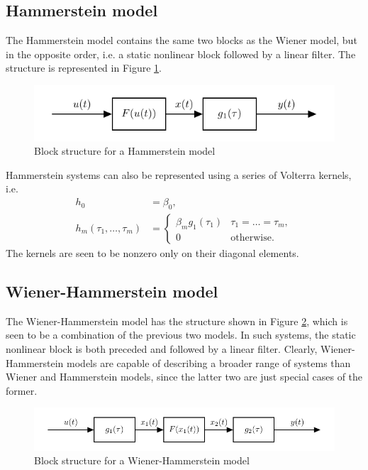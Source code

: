 \subsection{Hammerstein model}

The Hammerstein model contains the same two blocks as the Wiener model, but in the opposite order, i.e. a static nonlinear block followed by a linear filter. The structure is represented in Figure \ref{fig:HammersteinBS}.

\begin{figure}[!h]
\centering
\includegraphics[scale=1]{Chapter3_VolterraSeries/HammersteinSystem.pdf}
\caption{Block structure for a Hammerstein model}
\label{fig:HammersteinBS}
\end{figure}

Hammerstein systems can also be represented using a series of Volterra kernels, i.e.
\begin{align}
h_0 &= \beta_0, \nonumber \\
h_m(\tau_1,\hdots,\tau_m) &= \begin{cases} \beta_m g_1(\tau_1) & \tau_1 = \hdots = \tau_m, \\ 0 & \textrm{otherwise}. \end{cases}
\end{align}
The kernels are seen to be nonzero only on their diagonal elements.

\subsection{Wiener-Hammerstein model}

The Wiener-Hammerstein model has the structure shown in Figure \ref{fig:WienerHammBS}, which is seen to be a combination of the previous two models. In such systems, the static nonlinear block is both preceded and followed by a linear filter. Clearly, Wiener-Hammerstein models are capable of describing a broader range of systems than Wiener and Hammerstein models, since the latter two are just special cases of the former.

\begin{figure}[!h]
\centering
\includegraphics[scale=1]{Chapter3_VolterraSeries/WienerHammSystem.pdf}
\caption{Block structure for a Wiener-Hammerstein model}
\label{fig:WienerHammBS}
\end{figure}

